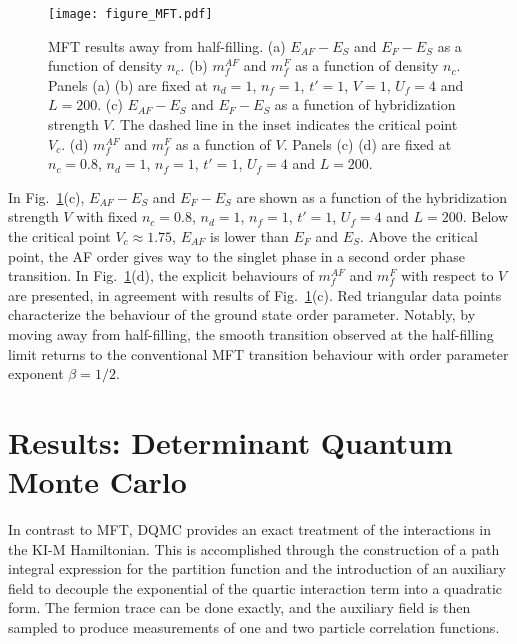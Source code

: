 \documentclass[pra,letterpaper,10pt,twocolumn]{revtex4}
\begin{document}
\begin{figure}[!h]
\texttt{[image: figure\_MFT.pdf]} 
\caption{
MFT results away from half-filling. (a) $E_{AF}-E_{S}$ and $E_{F} -
E_{S}$ as a function of density $n_c$. (b) $m^{AF}_f$ and $m^{F}_f$ as a
function of density $n_c$. Panels (a) (b) are fixed at $n_d=1$, $n_f=1$,
$t'=1$, $V=1$, $U_f=4$ and $L=200$. (c) $E_{AF}-E_{S}$ and $E_{F} -
E_{S}$ as a function of hybridization strength $V$. The dashed line in the inset
indicates the critical point $V_c$. (d) $m^{AF}_f$ and
$m^{F}_f$ as a function of $V$. Panels (c) (d) are fixed at $n_c=0.8$,
$n_d=1$, $n_f=1$, $t'=1$, $U_f=4$ and $L=200$.
\label{fig:figure_MFT}
}
\end{figure}

In Fig.~\ref{fig:figure_MFT}(c), $E_{AF}-E_{S}$ and $E_{F}-E_{S}$ are
shown as a function of the hybridization strength $V$ with fixed
$n_c=0.8$, $n_d=1$, $n_f=1$, $t'=1$, $U_f=4$ and $L=200$. Below the
critical point $V_c\approx 1.75$, $E_{AF}$ is lower than $E_{F}$ and
$E_{S}$. Above the critical point,
the AF order gives way to the singlet phase in a second order
phase transition. In Fig.~\ref{fig:figure_MFT}(d), the explicit
behaviours of $m^{AF}_f$ and $m^{F}_f$ with respect to $V$ are
presented, in agreement with results of
Fig.~\ref{fig:figure_MFT}(c). Red triangular data points characterize
the behaviour of the ground state order parameter. Notably, by moving
away from half-filling, the smooth transition observed at the
half-filling limit returns to the conventional MFT transition behaviour with
order parameter exponent $\beta = 1/2$.


\section{Results:  Determinant Quantum Monte Carlo}

In contrast to MFT, DQMC provides an exact treatment of the 
interactions in the KI-M Hamiltonian.  This is accomplished through
the construction of a path integral expression for the partition
function and the introduction of an auxiliary field 
to decouple the exponential of the quartic interaction term
into a quadratic form\cite{Blankenbecler81}.  The fermion
trace can be done exactly, and the auxiliary field is then sampled to
produce measurements of one and two particle correlation functions.
\end{document}
